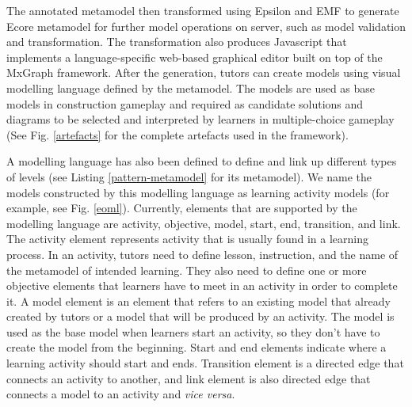 \documentclass[conference]{IEEEtran}
\begin{document}
The annotated metamodel then transformed using Epsilon \cite{kolovos2010epsilon} and EMF \cite{steinberg2008emf} to generate Ecore metamodel for further model operations on server, such as model validation and transformation. The transformation also produces Javascript that implements a language-specific web-based graphical editor built on top of the MxGraph framework. After the generation, tutors can create models using visual modelling language defined by the metamodel. The models are used as base models in construction gameplay and required as candidate solutions and diagrams to be selected and interpreted by learners in multiple-choice gameplay (See Fig. \ref{artefacts} for the complete artefacts used in the framework).  

A modelling language has also been defined to define and link up different types of levels (see Listing \ref{pattern-metamodel} for its metamodel). We name the models constructed by this modelling language as learning activity models (for example, see Fig. \ref{eoml}). Currently, elements that are supported by the modelling language are activity, objective, model, start, end, transition, and link. The activity element represents activity that is usually found in a learning process. In an activity, tutors need to define lesson, instruction, and the name of the metamodel of intended learning. They also need to define one or more objective elements that learners have to meet in an activity in order to complete it. A model element is an element that refers to an existing model that already created by tutors or a model that will be produced by an activity. The model is used as the base model when learners start an activity, so they don't have to create the model from the beginning. Start and end elements indicate where a learning activity should start and ends. Transition element is a directed edge that connects an activity to another, and link element is also directed edge that connects a model to an activity and \textit{vice versa}.
\end{document}
